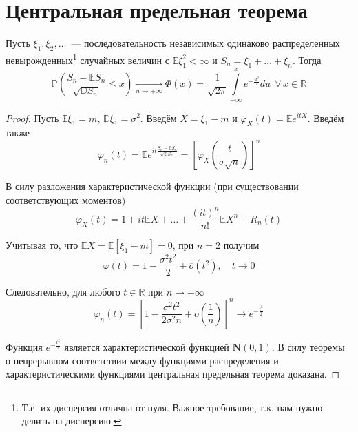 \section{Центральная предельная теорема}
\begin{namedthm}
    Пусть $\xi_{1}, \xi_{2}, \ldots$~--- последовательность независимых одинаково распределенных невырожденных\footnote{Т.е. их дисперсия отлична от нуля. Важное требование, т.к. нам нужно делить на дисперсию.} случайных величин с $\mathbb{E} \xi_{1}^{2}<\infty$ и $S_{n}=\xi_{1}+\ldots+\xi_{n}$. 
    Тогда
    \begin{equation*}
        \mathbb{P}\left(\frac{S_{n}-\mathbb{E} S_{n}}{\sqrt{\mathbb{D} S_{n}}} \leqslant x\right)
        \xrightarrow[n \to +\infty]{}
        \Phi(x) = \frac{1}{\sqrt{2 \pi}} \int\limits_{-\infty}^{x} e^{-\frac{u^{2}}{2}} du~~ \forall \, x \in \mathbb{R}
    \end{equation*}
\end{namedthm}
\begin{proof}
Пусть $\mathbb{E} \xi_{1}=m,\, \mathbb{D} \xi_{1}=\sigma^{2}$. 
Введём $X = \xi_1 - m$ и $\varphi_X(t)=\mathbb{E} e^{i tX}$. 
Введём также
\begin{equation*}
    \varphi_{n}(t)=\mathbb{E} e^{i t \frac{S_{n}-\mathbb{E} S_{n}}{\sqrt{\mathbb{D} S_{n}}}} = 
    \left[\varphi_X\left(\frac{t}{\sigma \sqrt{n}}\right)\right]^{n}
\end{equation*}

В силу разложения характеристической функции (при существовании соответствующих моментов)
\begin{equation*}
    \varphi_{X}(t)=1+i t \mathbb{E} X+\ldots+\frac{(i t)^{n}}{n !} \mathbb{E} X^{n}+R_{n}(t)
\end{equation*}

Учитывая то, что $\mathbb{E}X = \mathbb{E}\left[ \xi_1 - m\right] = 0$, при $n=2$ получим 
\begin{equation*}
    \varphi(t)=1-\frac{\sigma^{2} t^{2}}{2}+\overline{o}\left(t^{2}\right), \quad t \rightarrow 0
\end{equation*}

Следовательно, для любого $t \in \mathbb{R}$ при $n \to +\infty$
\begin{equation*}
    \varphi_{n}(t)=\left[1-\frac{\sigma^{2} t^{2}}{2 \sigma^{2} n}+\overline{o}\left(\frac{1}{n}\right)\right]^n \rightarrow e^{-\frac{t^{2}}{2}}
\end{equation*}

Функция $e^{-\frac{t^{2}}{2}}$ является характеристической функцией $\mathbf{N}(0,1)$. 
В силу теоремы о непрерывном соответствии между функциями распределения и характеристическими функциями центральная предельная теорема доказана.
\end{proof}
